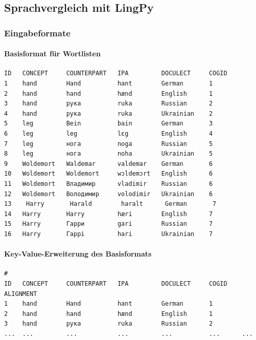 \subsection{Sprachvergleich mit LingPy}

\subsubsection{\texorpdfstring{{Eingabeformate}}{Eingabeformate}}

\paragraph{Basisformat für Wortlisten}

\begin{verbatim}
ID   CONCEPT     COUNTERPART   IPA         DOCULECT     COGID
1    hand        Hand          hant        German       1
2    hand        hand          hænd        English      1
3    hand        рука          ruka        Russian      2
4    hand        рука          ruka        Ukrainian    2
5    leg         Bein          bain        German       3
6    leg         leg           lɛg         English      4
7    leg         нога          noga        Russian      5
8    leg         нога          noha        Ukrainian    5
9    Woldemort   Waldemar      valdemar    German       6
10   Woldemort   Woldemort     wɔldemɔrt   English      6
11   Woldemort   Владимир      vladimir    Russian      6
12   Woldemort   Володимир     volodimir   Ukrainian    6
13    Harry       Harald        haralt      German       7
14   Harry       Harry         hæri        English      7
15   Harry       Гарри         gari        Russian      7
16   Harry       Гаррi         hari        Ukrainian    7
\end{verbatim}




\paragraph{Key-Value-Erweiterung des Basisformats}

\begin{verbatim}
#
ID   CONCEPT     COUNTERPART   IPA         DOCULECT     COGID    ALIGNMENT
1    hand        Hand          hant        German       1        
2    hand        hand          hænd        English      1        
3    hand        рука          ruka        Russian      2        
...  ...         ...           ...         ...          ...      ...
\end{verbatim}




